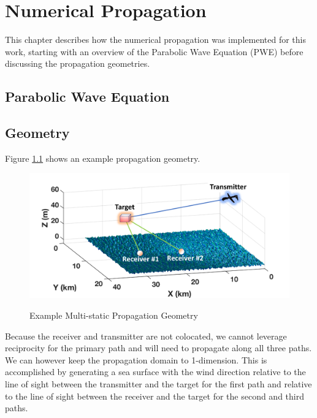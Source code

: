 \chapter{Numerical Propagation}
\label{numerical_propagation}
This chapter describes how the numerical propagation was implemented for this work, starting with an overview of the Parabolic Wave Equation (PWE) before discussing the propagation geometries.

\section{Parabolic Wave Equation}

\section{Geometry}
Figure \ref{np_fig:1} shows an example propagation geometry.
\begin{figure}[H]
  \begin{center} 
\includegraphics[width=5in]{../media/multistatic/ms_rf_concept2.png}
  \end{center}
  \renewcommand{\baselinestretch}{1} \small\normalsize
  \begin{quote}
    \caption[Example Multi-static Propagation Geometry]{Example Multi-static Propagation Geometry\label{np_fig:1}}
  \end{quote}
\end{figure}
\renewcommand{\baselinestretch}{2} \small\normalsize

Because the receiver and transmitter are not colocated, we cannot leverage reciprocity for the primary path and will need to propagate along all three paths. We can however keep the propagation domain to 1-dimension. This is accomplished by generating a sea surface with the wind direction relative to the line of sight between the transmitter and the target for the first path and relative to the line of sight between the receiver and the target for the second and third paths.